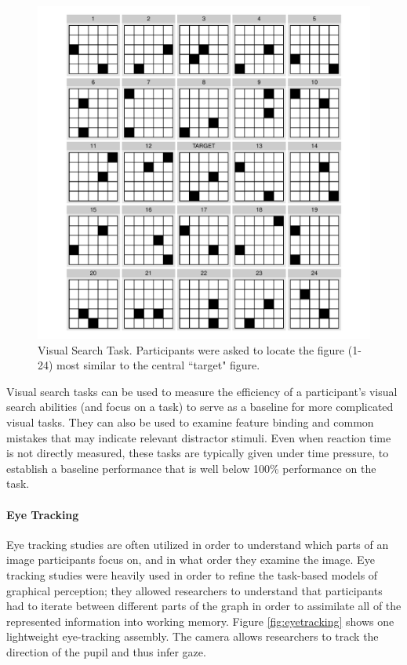 \documentclass[11pt]{isuthesis}\usepackage[]{graphicx}\usepackage[]{color}
\begin{document}
\begin{figure}[htbp]\centering
\includegraphics[width=.7\textwidth]{VisualSearch}
\caption[Visual Search Task]{Visual Search Task. Participants were asked to locate the figure (1-24) most similar to the central ``target" figure.}\label{fig:visualsearch}
\end{figure}

Visual search tasks can be used to measure the efficiency of a participant's visual search abilities (and focus on a task) to serve as a baseline for more complicated visual tasks. They can also be used to examine feature binding and common mistakes that may indicate relevant distractor stimuli. Even when reaction time is not directly measured, these tasks are typically given under time pressure, to establish a baseline performance that is well below 100\% performance on the task. 

\paragraph{Eye Tracking} \label{eyetracking}
Eye tracking studies are often utilized in order to understand which parts of an image participants focus on, and in what order they examine the image. Eye tracking studies were heavily used in order to refine the task-based models of graphical perception; they allowed researchers to understand that participants had to iterate between different parts of the graph in order to assimilate all of the represented information into working memory. Figure \ref{fig:eyetracking} shows one lightweight eye-tracking assembly. The camera allows researchers to track the direction of the pupil and thus infer gaze. 
\end{document}

